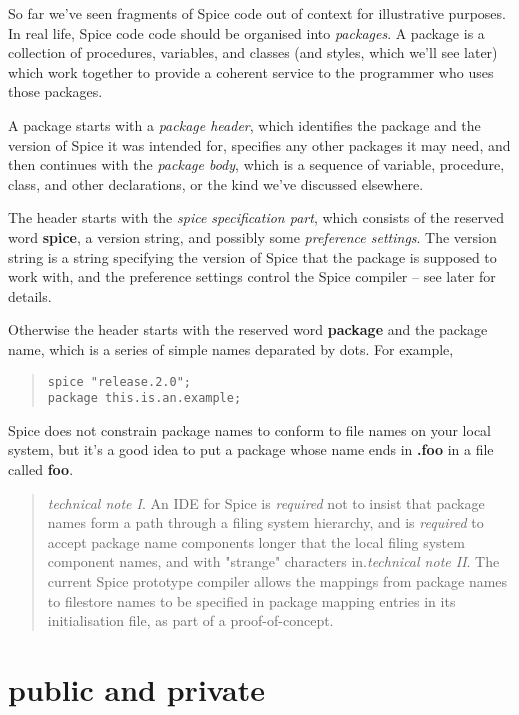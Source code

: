 \documentclass{report}
\begin{document}
So far we've seen fragments of Spice code out of context for illustrative
purposes. In real life, Spice code code should be organised into {\em packages}.
A package is a collection of procedures, variables, and classes (and styles,
which we'll see later) which work together to provide a coherent service to
the programmer who uses those packages.

A package starts with a {\em package header}, which identifies the package and the
version of Spice it was intended for, specifies any other packages it may need,
and then continues with the {\em package body}, which is a sequence of variable,
procedure, class, and other declarations, or the kind we've discussed
elsewhere.

The header starts with the {\em spice specification part}, which consists of
the reserved word {\bf spice}, a version string, and possibly some {\em preference
settings}. The version string is a string specifying the version of Spice
that the package is supposed to work with, and the preference settings control
the Spice compiler -- see later for details.

Otherwise the header starts with the reserved word {\bf package} and the package
name, which is a series of simple names deparated by dots. For example,

\begin{quote}
\begin{verbatim}
spice "release.2.0";
package this.is.an.example;
\end{verbatim}
\end{quote}
Spice does not constrain package names to conform to file names on your local
system, but it's a good idea to put a package whose name ends in {\bf .foo} in a
file called {\bf foo}.

\begin{quote}{\em technical note I}. An IDE for Spice is {\em required} not to insist that package
names form a path through a filing system hierarchy, and is {\em required} to
accept package name components longer that the local filing system component
names, and with "strange" characters in.{\em technical note II}. The current Spice prototype compiler allows the mappings
from package names to filestore names to be specified in package mapping
entries in its initialisation file, as part of a proof-of-concept.
\end{quote}\section{public and private}
\end{document}

